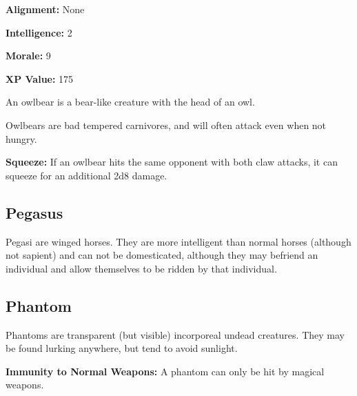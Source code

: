 \begin{multicols*}{2}
{\textbf{Alignment:} None

\textbf{Intelligence:} 2

\textbf{Morale:} 9

\textbf{XP Value:} 175}

An owlbear is a bear-like creature with the head of an owl.

Owlbears are bad tempered carnivores, and will often attack even when not hungry.

\textbf{Squeeze:} If an owlbear hits the same opponent with both claw attacks, it can squeeze for an additional 2d8 damage.

\subsection{Pegasus}\label{monster:Pegasus}

Pegasi are winged horses. They are more intelligent than normal horses (although not sapient) and can not be domesticated, although they may befriend an individual and allow themselves to be ridden by that individual.



\subsection{Phantom}
Phantoms are transparent (but visible) incorporeal undead creatures. They may be found lurking anywhere, but tend to avoid sunlight.

\textbf{Immunity to Normal Weapons:} A phantom can only be hit by magical weapons.


\end{multicols*}
